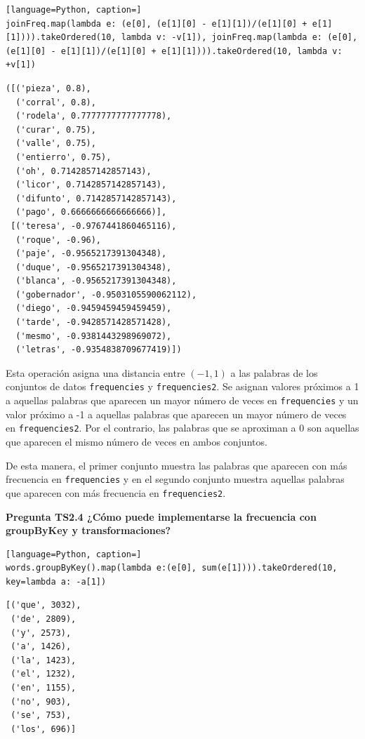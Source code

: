 \documentclass[10pt,swedish, openany]{book}
\begin{document}
\begin{lstlisting}[language=Python, caption=]
joinFreq.map(lambda e: (e[0], (e[1][0] - e[1][1])/(e[1][0] + e[1][1]))).takeOrdered(10, lambda v: -v[1]), joinFreq.map(lambda e: (e[0], (e[1][0] - e[1][1])/(e[1][0] + e[1][1]))).takeOrdered(10, lambda v: +v[1])
\end{lstlisting}
\begin{verbatim}
([('pieza', 0.8),
  ('corral', 0.8),
  ('rodela', 0.7777777777777778),
  ('curar', 0.75),
  ('valle', 0.75),
  ('entierro', 0.75),
  ('oh', 0.7142857142857143),
  ('licor', 0.7142857142857143),
  ('difunto', 0.7142857142857143),
  ('pago', 0.6666666666666666)],
 [('teresa', -0.9767441860465116),
  ('roque', -0.96),
  ('paje', -0.9565217391304348),
  ('duque', -0.9565217391304348),
  ('blanca', -0.9565217391304348),
  ('gobernador', -0.9503105590062112),
  ('diego', -0.9459459459459459),
  ('tarde', -0.9428571428571428),
  ('mesmo', -0.9381443298969072),
  ('letras', -0.9354838709677419)])
\end{verbatim}

Esta operación asigna una distancia entre $(-1,1)$ a las palabras de los conjuntos de datos \texttt{frequencies} y \texttt{frequencies2}. Se asignan valores próximos a 1 a aquellas palabras que aparecen un mayor número de veces en \texttt{frequencies} y un valor próximo a -1 a aquellas palabras que aparecen un mayor número de veces en \texttt{frequencies2}. Por el contrario, las palabras que se aproximan a 0 son aquellas que aparecen el mismo número de veces en ambos conjuntos. 

De esta manera, el primer conjunto muestra las palabras que aparecen con más frecuencia en \texttt{frequencies} y en el segundo conjunto muestra aquellas palabras que aparecen con más frecuencia en \texttt{frequencies2}.

\vspace{0.8em}

\textbf{Pregunta TS2.4 ¿Cómo puede implementarse la frecuencia con groupByKey y transformaciones?}

\begin{lstlisting}[language=Python, caption=]
words.groupByKey().map(lambda e:(e[0], sum(e[1]))).takeOrdered(10, key=lambda a: -a[1])
\end{lstlisting}
\begin{verbatim}
[('que', 3032),
 ('de', 2809),
 ('y', 2573),
 ('a', 1426),
 ('la', 1423),
 ('el', 1232),
 ('en', 1155),
 ('no', 903),
 ('se', 753),
 ('los', 696)]
\end{verbatim}
\end{document}
